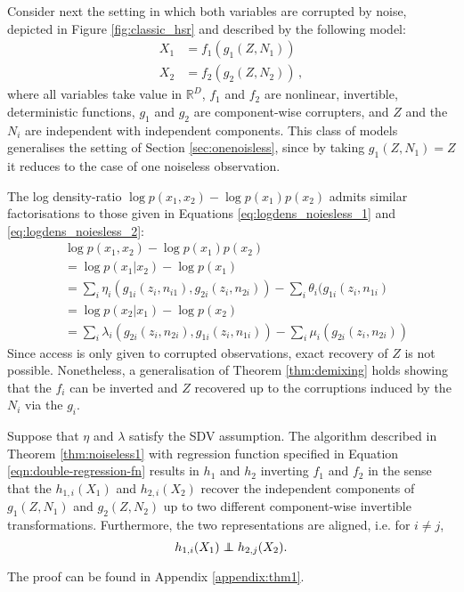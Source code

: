 Consider next the setting in which both variables are corrupted by noise, depicted in Figure \ref{fig:classic_hsr} and described by the following model:
\begin{align*}
X_{1}&={f}_{1}({g}_{1}({Z},N_{1}))  \\
X_{2}&={f}_{2}({g}_{2}({Z},N_{2}))  \,,
\end{align*}
where all variables take value in $\mathbb{R}^D$, ${f}_{1}$ and ${f}_{2}$ are nonlinear, invertible, deterministic functions,
${g}_{1}$ and ${g}_{2}$ are component-wise corrupters, and $Z$ and the $N_i$ are independent with independent components.
This class of models generalises the setting of Section \ref{sec:onenoisless}, since by taking ${g}_1(Z, N_1) = Z$ it reduces to the case of one noiseless observation.

The log density-ratio $\log p({x}_1, {x}_2) - \log p({x}_1)p({x}_2)$ admits similar factorisations to those given in Equations \ref{eq:logdens_noiesless_1} and \ref{eq:logdens_noiesless_2}:
\begin{align}
&\log p({x}_1, {x}_2) - \log p({x}_1) p({x}_2) \nonumber\\
&= \log p({x}_1 | {x}_2) - \log p({x}_1)\nonumber\\
&= \sum_i \eta_i(g_{1i}(z_i, n_{i1}), g_{2i}(z_i, n_{2i})) - \sum_i \theta_i(g_{1i}(z_i, n_{1i}) \label{eq:noisylogdens_1}\\
&= \log p({x}_2 | {x}_1) - \log p({x}_2) \nonumber\\
&= \sum_i \lambda_i(g_{2i}(z_i, n_{2i}), g_{1i}(z_i, n_{1i})) - \sum_i \mu_i(g_{2i}(z_i, n_{2i})) \label{eq:noisylogdens_2}
\end{align}
Since access is only given to corrupted observations, exact recovery of $Z$ is not possible.
Nonetheless, a generalisation of Theorem \ref{thm:demixing} holds showing that the ${f}_i$ can be inverted and $Z$ recovered up to the corruptions induced by the $N_i$ via the ${g}_i$.

\medskip

\begin{theorem}\label{thm:two-noisy-views}
	Suppose that ${\eta}$ and ${\lambda}$ satisfy the SDV assumption.
	The algorithm described in Theorem \ref{thm:noiseless1} with regression function specified in Equation \ref{eqn:double-regression-fn} results in ${h}_1$ and ${h}_2$ inverting ${f}_1$ and ${f}_2$ in the sense that the $h_{1,i}({X}_1)$ and $h_{2,i}({X}_2)$ recover the independent components of ${g}_1({Z}, {N}_1)$ and ${g}_2({Z}, {N}_2)$ up to two different component-wise invertible transformations. Furthermore, the two representations are aligned, i.e. for $i\not=j$,
	\begin{equation*}
	h_{1,i}({X}_{1})\independent h_{2,j}({X}_{2}).
	\end{equation*}
\end{theorem}
The proof can be found in Appendix \ref{appendix:thm1}.

